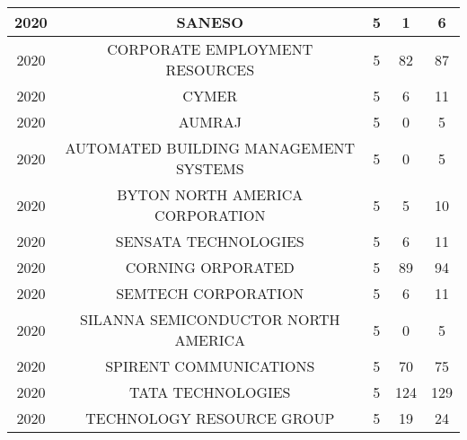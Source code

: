 \documentclass{article}%
\begin{document}
\begin{longtable}{c|c|c|c|c}
\hline%
2020&SANESO&5&1&6\\%
\hline%
2020&CORPORATE EMPLOYMENT RESOURCES&5&82&87\\%
\hline%
2020&CYMER&5&6&11\\%
\hline%
2020&AUMRAJ&5&0&5\\%
\hline%
2020&AUTOMATED BUILDING MANAGEMENT SYSTEMS&5&0&5\\%
\hline%
2020&BYTON NORTH AMERICA CORPORATION&5&5&10\\%
\hline%
2020&SENSATA TECHNOLOGIES&5&6&11\\%
\hline%
2020&CORNING ORPORATED&5&89&94\\%
\hline%
2020&SEMTECH CORPORATION&5&6&11\\%
\hline%
2020&SILANNA SEMICONDUCTOR NORTH AMERICA&5&0&5\\%
\hline%
2020&SPIRENT COMMUNICATIONS&5&70&75\\%
\hline%
2020&TATA TECHNOLOGIES&5&124&129\\%
\hline%
2020&TECHNOLOGY RESOURCE GROUP&5&19&24\\%
\hline%
\end{longtable}

%
\end{document}
